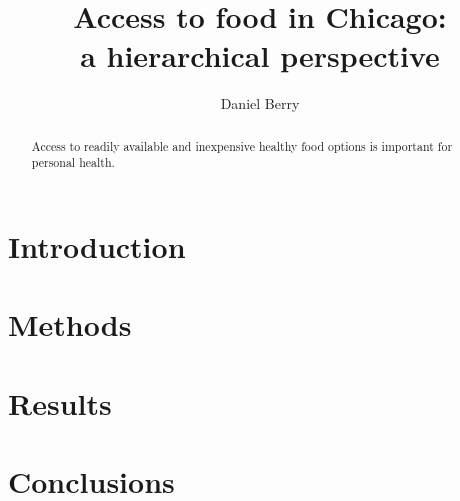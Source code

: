 \documentclass{IEEEtran}
\title{Access to food in Chicago: \\ a hierarchical perspective}
\author{Daniel Berry}
\begin{document}
\maketitle

\begin{abstract}
  Access to readily available and inexpensive healthy food options is important for personal health. 
\end{abstract}

\section{Introduction}

\section{Methods}

\section{Results}

\section{Conclusions}
\end{document}
